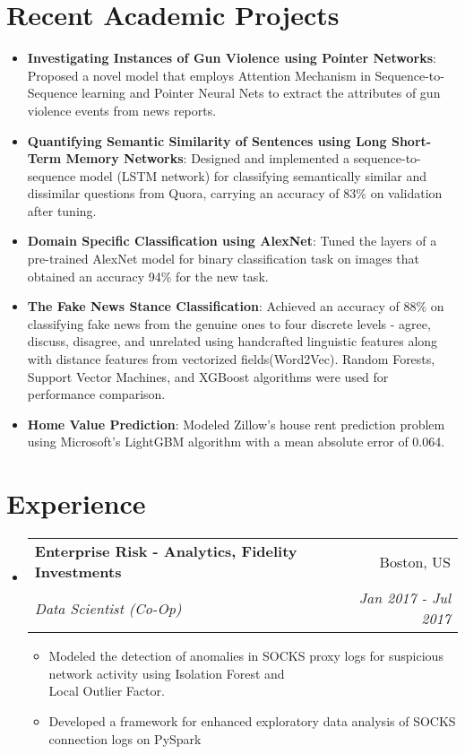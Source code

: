 \documentclass[letterpaper,10pt]{article}
\makeatletter
\newcommand{\resumeItem}[2]{
  \item\small{
    \textbf{#1}{: #2 \vspace{-2pt}}
  }
}
\newcommand{\resumeBullet}[2]{
  \item\small{
    \textbf{#1}{#2 \vspace{-2pt}}
  }
}
\newcommand{\resumeSubheading}[4]{
  \vspace{-1pt}\item
    \begin{tabular*}{0.97\textwidth}{l@{\extracolsep{\fill}}r}
      \textbf{#1} & #2 \\
      \textit{\small#3} & \textit{\small #4} \\
    \end{tabular*}\vspace{-5pt}
}
\newcommand{\resumeSubItem}[2]{\resumeItem{#1}{#2}\vspace{-4pt}}
\newcommand{\resumeJobFunc}[2]{\resumeBullet{#1}{#2}\vspace{-0pt}}
\newcommand{\resumeSubHeadingListStart}{\begin{itemize}[leftmargin=*]}
\newcommand{\resumeSubHeadingListEnd}{\end{itemize}}
\newcommand{\resumeItemListStart}{\begin{itemize}}
\newcommand{\resumeItemListEnd}{\end{itemize}\vspace{-5pt}}
\makeatother
\begin{document}
\section{Recent Academic Projects}
  \resumeSubHeadingListStart
    \resumeSubItem{Investigating Instances of Gun Violence using Pointer Networks}
      {Proposed a novel model that employs Attention Mechanism in Sequence-to-Sequence learning and Pointer Neural Nets to extract the attributes of gun violence events from news reports.}
    \resumeSubItem{Quantifying Semantic Similarity of Sentences using Long Short-Term Memory Networks}
      {Designed and implemented a sequence-to-sequence model (LSTM network) for classifying semantically similar and dissimilar questions from Quora, carrying an accuracy of 83\% on validation after tuning.}
    \resumeSubItem{Domain Specific Classification using AlexNet}
      {Tuned the layers of a pre-trained AlexNet model for binary classification task on images that obtained an accuracy 94\% for the new task.}
    \resumeSubItem{The Fake News Stance Classification}
    {Achieved an accuracy of 88\% on classifying fake news from the genuine ones to four discrete levels - agree, discuss, disagree, and unrelated using handcrafted linguistic features along with distance features from vectorized fields(Word2Vec). Random Forests, Support Vector Machines, and XGBoost algorithms were used for performance comparison.}
    \resumeSubItem{Home Value Prediction}
    {Modeled Zillow's house rent prediction problem using Microsoft's LightGBM algorithm with a mean absolute error of 0.064.}

  \resumeSubHeadingListEnd
      
  

\section{Experience}

\resumeSubHeadingListStart
    \resumeSubheading
      {Enterprise Risk - Analytics, Fidelity Investments}{Boston, US}
      {Data Scientist (Co-Op)}{Jan 2017 - Jul 2017}
      \resumeItemListStart
      \resumeJobFunc{}{Modeled the detection of anomalies in SOCKS proxy logs for suspicious network activity using Isolation Forest and \\Local Outlier Factor.}
      \resumeJobFunc{}{Developed a framework for enhanced exploratory data analysis of SOCKS connection logs on PySpark}
      \resumeItemListEnd
      \resumeSubHeadingListEnd
      
\end{document}
